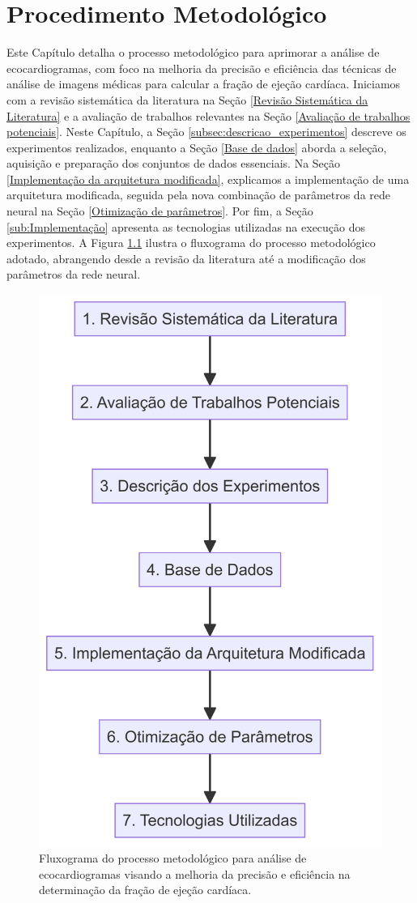 \chapter{Procedimento Metodológico}
\label{Metodologia}

Este Capítulo detalha o processo metodológico para aprimorar a análise de ecocardiogramas, com foco na melhoria da precisão e eficiência das técnicas de análise de imagens médicas para calcular a fração de ejeção cardíaca. Iniciamos com a revisão sistemática da literatura na Seção \ref{Revisão Sistemática da Literatura} e a avaliação de trabalhos relevantes na Seção \ref{Avaliação de trabalhos potenciais}. Neste Capítulo, a Seção \ref{subsec:descricao_experimentos} descreve os experimentos realizados, enquanto a Seção \ref{Base de dados} aborda a seleção, aquisição e preparação dos conjuntos de dados essenciais. Na Seção \ref{Implementação da arquitetura modificada}, explicamos a implementação de uma arquitetura modificada, seguida pela nova combinação de parâmetros da rede neural na Seção \ref{Otimização de parâmetros}. Por fim, a Seção \ref{sub:Implementação} apresenta as tecnologias utilizadas na execução dos experimentos. A Figura \ref{fig:procedimento_metodologico} ilustra o fluxograma do processo metodológico adotado, abrangendo desde a revisão da literatura até a modificação dos parâmetros da rede neural.

\begin{figure}
    \centering
    \includegraphics[width=0.5\linewidth]{capitulos//figuras/procedimentometo.png}
    \caption{Fluxograma do processo metodológico para análise de ecocardiogramas visando a melhoria da precisão e eficiência na determinação da fração de ejeção cardíaca.}
    \label{fig:procedimento_metodologico}
\end{figure}


